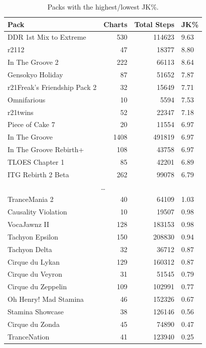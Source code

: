 \documentclass[10pt]{sigplanconf}
\begin{document}
\begin{table}[p]
	\begin{center}
		\small
	\begin{tabular}{l|r|r|l}
		\bf Pack & \bf Charts & \bf Total Steps & \bf JK\% \\
		\hline
		DDR 1st Mix to Extreme   &  530 & 114623 & 9.63 \\
		r2112                    &   47 &  18377 & 8.80 \\
		In The Groove 2          &  222 &  66113 & 8.64 \\
		Gensokyo Holiday         &   87 &  51652 & 7.87 \\
		r21Freak's Friendship Pack 2 &   32 &  15649 & 7.71 \\
		Omnifarious              &   10 &   5594 & 7.53 \\
		r21twins                 &   52 &  22347 & 7.18 \\
		Piece of Cake 7          &   20 &  11554 & 6.97 \\
		In The Groove            & 1408 & 491819 & 6.97 \\
		In The Groove Rebirth+   &  108 &  43758 & 6.97 \\
		TLOES Chapter 1          &   85 &  42201 & 6.89 \\
		ITG Rebirth 2 Beta       &  262 &  99078 & 6.79 \\
		\multicolumn{4}{c}{\normalsize\dots} \\
		TranceMania 2            &   40 &  64109 & 1.03 \\
		Causality Violation      &   10 &  19507 & 0.98 \\
		VocaJawnz II             &  128 & 183153 & 0.98 \\
		Tachyon Epsilon          &  150 & 208830 & 0.94 \\
		Tachyon Delta            &   32 &  36712 & 0.87 \\
		Cirque du Lykan          &  129 & 160312 & 0.87 \\
		Cirque du Veyron         &   31 &  51545 & 0.79 \\
		Cirque du Zeppelin       &  109 & 102991 & 0.77 \\
		Oh Henry! Mad Stamina    &   46 & 152326 & 0.67 \\
		Stamina Showcase         &   38 & 126146 & 0.56 \\
		Cirque du Zonda          &   45 &  74890 & 0.47 \\
		TranceNation             &   41 & 123940 & 0.25 \\
	\end{tabular}
	\end{center}
	\caption{Packs with the highest/lowest JK\%.}
	\label{tab:pack-jk}
\end{table}
\end{document}
